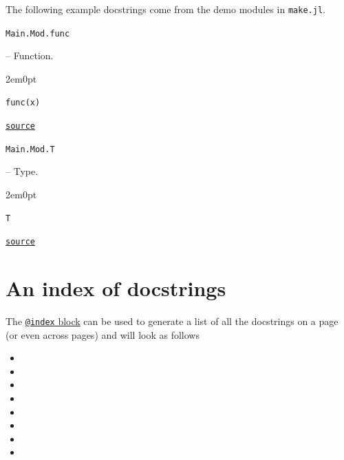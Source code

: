 \label{4609624952331602323}{}


The following example docstrings come from the demo modules in \texttt{make.jl}.


\hypertarget{16772846123705308175}{\texttt{Main.Mod.func}}  -- {Function.}

\begin{adjustwidth}{2em}{0pt}


\begin{verbatim}
func(x)
\end{verbatim}




\href{https://example.org/Repository.jl/blob/make.jl#L30-34}{\texttt{source}}


\end{adjustwidth}
\hypertarget{9167933748838420923}{\texttt{Main.Mod.T}}  -- {Type.}

\begin{adjustwidth}{2em}{0pt}


\begin{verbatim}
T
\end{verbatim}




\href{https://example.org/Repository.jl/blob/make.jl#L37-41}{\texttt{source}}


\end{adjustwidth}

\section{An index of docstrings}



\label{8184953398417917887}{}


The \href{@ref}{\texttt{@index} block} can be used to generate a list of all the docstrings on a page (or even across pages) and will look as follows


\begin{itemize}
\item {}
\item {}
\item {}
\item {}
\item {}
\item {}
\item {}
\item {}
\end{itemize}


